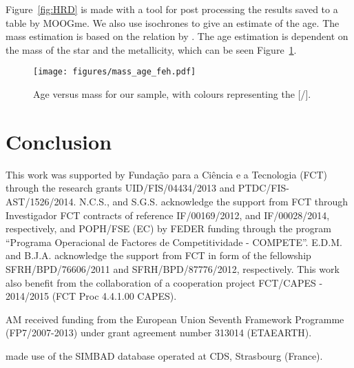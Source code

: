 \documentclass{aa}
\begin{document}
Figure~\ref{fig:HRD} is made with a tool for post processing the results
saved to a table by MOOGme. We also use isochrones \citep{Morton2015}
to give an estimate of the age. The mass estimation is based on the relation
by \citet{Torres2010}. The age estimation is dependent on the mass of the
star and the metallicity, which can be seen Figure~\ref{fig:age}.

\begin{figure}[tpb]
    \centering
    \texttt{[image: figures/mass\_age\_feh.pdf]}
    \caption{Age versus mass for our sample, with colours representing the
    [/].}
    \label{fig:age}
\end{figure}



\section{Conclusion}
\label{sec:conclusion}




\begin{acknowledgements}

This work was supported by Funda\c{c}\~ao para a Ci\^encia e a
Tecnologia (FCT) through the research grants UID/FIS/04434/2013 and
PTDC/FIS-AST/1526/2014. N.C.S., and S.G.S. acknowledge the support from
FCT through Investigador FCT contracts of reference IF/00169/2012, and
IF/00028/2014, respectively, and POPH/FSE (EC) by FEDER funding through
the program “Programa Operacional de Factores de Competitividade
- COMPETE”. E.D.M. and B.J.A. acknowledge the support from FCT in
form of the fellowship SFRH/BPD/76606/2011 and SFRH/BPD/87776/2012,
respectively. This work also benefit from the collaboration of a
cooperation project FCT/CAPES - 2014/2015 (FCT Proc 4.4.1.00 CAPES).

AM received funding from the European Union Seventh Framework Programme
(FP7/2007-2013) under grant agreement number 313014 (ETAEARTH).


 made use of the SIMBAD database operated at CDS,
Strasbourg (France).

\end{acknowledgements}




\end{document}
